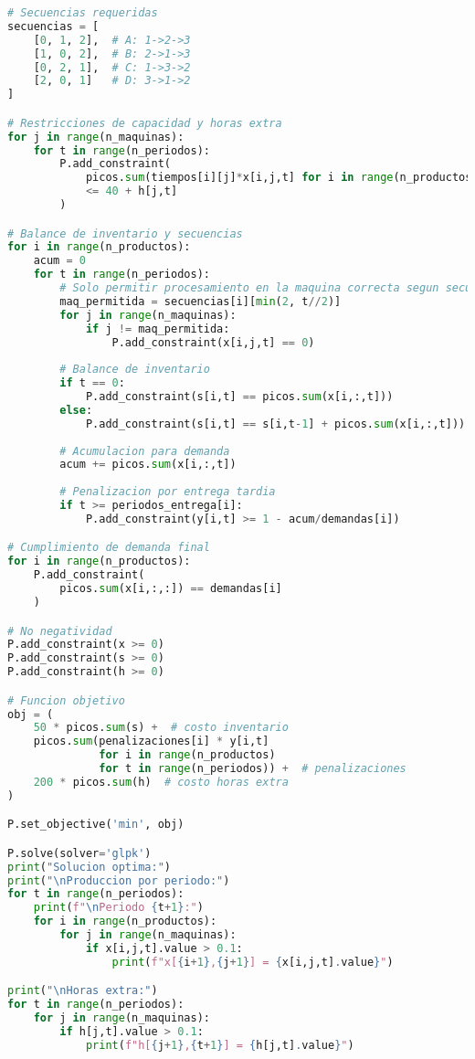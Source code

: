 \documentclass[12pt]{article}
\begin{document}
\begin{enumerate}
\begin{lstlisting}[language=Python]
# Secuencias requeridas
secuencias = [
    [0, 1, 2],  # A: 1->2->3
    [1, 0, 2],  # B: 2->1->3
    [0, 2, 1],  # C: 1->3->2
    [2, 0, 1]   # D: 3->1->2
]

# Restricciones de capacidad y horas extra
for j in range(n_maquinas):
    for t in range(n_periodos):
        P.add_constraint(
            picos.sum(tiempos[i][j]*x[i,j,t] for i in range(n_productos)) 
            <= 40 + h[j,t]
        )

# Balance de inventario y secuencias
for i in range(n_productos):
    acum = 0
    for t in range(n_periodos):
        # Solo permitir procesamiento en la maquina correcta segun secuencia
        maq_permitida = secuencias[i][min(2, t//2)]
        for j in range(n_maquinas):
            if j != maq_permitida:
                P.add_constraint(x[i,j,t] == 0)
        
        # Balance de inventario
        if t == 0:
            P.add_constraint(s[i,t] == picos.sum(x[i,:,t]))
        else:
            P.add_constraint(s[i,t] == s[i,t-1] + picos.sum(x[i,:,t]))
        
        # Acumulacion para demanda
        acum += picos.sum(x[i,:,t])
        
        # Penalizacion por entrega tardia
        if t >= periodos_entrega[i]:
            P.add_constraint(y[i,t] >= 1 - acum/demandas[i])

# Cumplimiento de demanda final
for i in range(n_productos):
    P.add_constraint(
        picos.sum(x[i,:,:]) == demandas[i]
    )

# No negatividad
P.add_constraint(x >= 0)
P.add_constraint(s >= 0)
P.add_constraint(h >= 0)

# Funcion objetivo
obj = (
    50 * picos.sum(s) +  # costo inventario
    picos.sum(penalizaciones[i] * y[i,t] 
              for i in range(n_productos) 
              for t in range(n_periodos)) +  # penalizaciones
    200 * picos.sum(h)  # costo horas extra
)

P.set_objective('min', obj)

P.solve(solver='glpk')
print("Solucion optima:")
print("\nProduccion por periodo:")
for t in range(n_periodos):
    print(f"\nPeriodo {t+1}:")
    for i in range(n_productos):
        for j in range(n_maquinas):
            if x[i,j,t].value > 0.1:
                print(f"x[{i+1},{j+1}] = {x[i,j,t].value}")

print("\nHoras extra:")
for t in range(n_periodos):
    for j in range(n_maquinas):
        if h[j,t].value > 0.1:
            print(f"h[{j+1},{t+1}] = {h[j,t].value}")


\end{lstlisting}
\end{enumerate}
\end{document}
